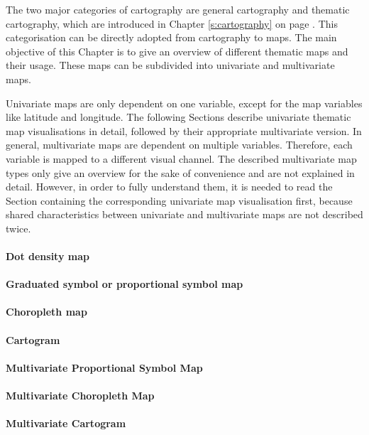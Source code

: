 The two major categories of cartography are general cartography and thematic cartography, which are introduced in Chapter \ref{s:cartography} on page \pageref{s:cartography}. This categorisation can be directly adopted from cartography to maps. The main objective of this Chapter is to give an overview of different thematic maps and their usage. These maps can be subdivided into univariate and multivariate maps.

Univariate maps are only dependent on one variable, except for the map variables like latitude and longitude. The following Sections describe univariate thematic map visualisations in detail, followed by their appropriate multivariate version. In general, multivariate maps are dependent on multiple variables. Therefore, each variable is mapped to a different visual channel. The described multivariate map types only give an overview for the sake of convenience and are not explained in detail. However, in order to fully understand them, it is needed to read the Section containing the corresponding univariate map visualisation first, because shared characteristics between univariate and multivariate maps are not described twice.

\paragraph{Dot density map}
\label{s:dot}


\paragraph{Graduated symbol or proportional symbol map}


\paragraph{Choropleth map}

\label{s:choropleth}

\paragraph{Cartogram}


\paragraph{Multivariate Proportional Symbol Map}


\paragraph{Multivariate Choropleth Map}


\paragraph{Multivariate Cartogram}
